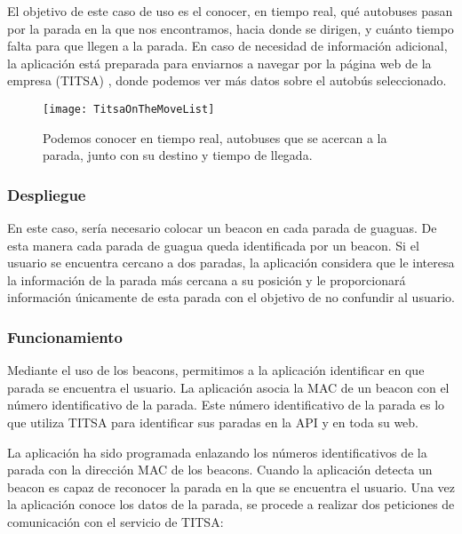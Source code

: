 El objetivo de este caso de uso es el conocer, en tiempo real, qué autobuses pasan por la parada en la que nos encontramos, hacia donde se dirigen, y cuánto tiempo falta para que llegen a la parada. En caso de necesidad de información adicional, la aplicación está preparada para enviarnos a navegar por la página web de la empresa (TITSA) , donde podemos ver más datos sobre el autobús seleccionado.

\begin{figure}[H]
	\centering
	\texttt{[image: TitsaOnTheMoveList]}
	\caption{Podemos conocer en tiempo real, autobuses que se acercan a la parada, junto con su destino y tiempo de llegada.}
	\label{fig:titsaOnTheMoveList}
\end{figure}

\subsubsection{Despliegue}

En este caso, sería necesario colocar un beacon en cada parada de guaguas. De esta manera cada parada de guagua queda identificada por un beacon. Si el usuario se encuentra cercano a dos paradas, la aplicación considera que le interesa la información de la parada más cercana a su posición y le proporcionará información únicamente de esta parada con el objetivo de no confundir al usuario.

\subsubsection{Funcionamiento}


Mediante el uso de los beacons, permitimos a la aplicación identificar en que parada se encuentra el usuario. La aplicación asocia la MAC de un beacon con el número identificativo de la parada. Este número identificativo de la parada es lo que utiliza TITSA para identificar sus paradas en la API y en toda su web.

La aplicación ha sido programada enlazando los números identificativos de la parada con la dirección MAC de los beacons. Cuando la aplicación detecta un beacon es capaz de reconocer la parada en la que se encuentra el usuario. Una vez la aplicación conoce los datos de la parada, se procede a realizar dos peticiones de comunicación con el servicio de TITSA: 

